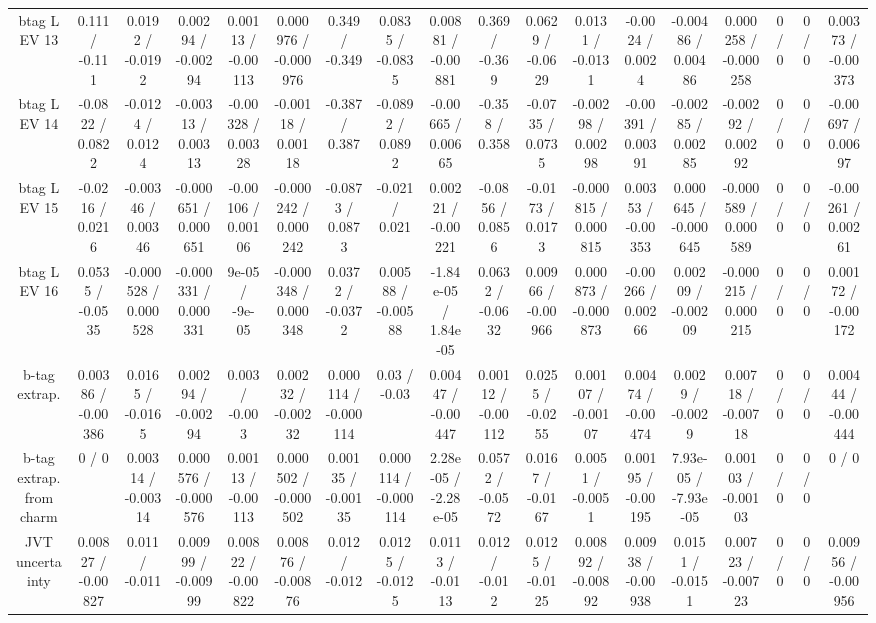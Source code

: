\documentclass[10pt]{article}
\begin{document}
\begin{table}[htbp]
\begin{center}
\begin{tabular}{|c|c|c|c|c|c|c|c|c|c|c|c|c|c|c|c|c|c|}
  btag L EV 13 & 0.111 / -0.111 & 0.0192 / -0.0192 & 0.00294 / -0.00294 & 0.00113 / -0.00113 & 0.000976 / -0.000976 & 0.349 / -0.349 & 0.0835 / -0.0835 & 0.00881 / -0.00881 & 0.369 / -0.369 & 0.0629 / -0.0629 & 0.0131 / -0.0131 & -0.0024 / 0.0024 & -0.00486 / 0.00486 & 0.000258 / -0.000258 & 0 / 0 & 0 / 0 & 0.00373 / -0.00373 \\ 
  btag L EV 14 & -0.0822 / 0.0822 & -0.0124 / 0.0124 & -0.00313 / 0.00313 & -0.00328 / 0.00328 & -0.00118 / 0.00118 & -0.387 / 0.387 & -0.0892 / 0.0892 & -0.00665 / 0.00665 & -0.358 / 0.358 & -0.0735 / 0.0735 & -0.00298 / 0.00298 & -0.00391 / 0.00391 & -0.00285 / 0.00285 & -0.00292 / 0.00292 & 0 / 0 & 0 / 0 & -0.00697 / 0.00697 \\ 
  btag L EV 15 & -0.0216 / 0.0216 & -0.00346 / 0.00346 & -0.000651 / 0.000651 & -0.00106 / 0.00106 & -0.000242 / 0.000242 & -0.0873 / 0.0873 & -0.021 / 0.021 & 0.00221 / -0.00221 & -0.0856 / 0.0856 & -0.0173 / 0.0173 & -0.000815 / 0.000815 & 0.00353 / -0.00353 & 0.000645 / -0.000645 & -0.000589 / 0.000589 & 0 / 0 & 0 / 0 & -0.00261 / 0.00261 \\ 
  btag L EV 16 & 0.0535 / -0.0535 & -0.000528 / 0.000528 & -0.000331 / 0.000331 & 9e-05 / -9e-05 & -0.000348 / 0.000348 & 0.0372 / -0.0372 & 0.00588 / -0.00588 & -1.84e-05 / 1.84e-05 & 0.0632 / -0.0632 & 0.00966 / -0.00966 & 0.000873 / -0.000873 & -0.00266 / 0.00266 & 0.00209 / -0.00209 & -0.000215 / 0.000215 & 0 / 0 & 0 / 0 & 0.00172 / -0.00172 \\ 
  b-tag extrap. & 0.00386 / -0.00386 & 0.0165 / -0.0165 & 0.00294 / -0.00294 & 0.003 / -0.003 & 0.00232 / -0.00232 & 0.000114 / -0.000114 & 0.03 / -0.03 & 0.00447 / -0.00447 & 0.00112 / -0.00112 & 0.0255 / -0.0255 & 0.00107 / -0.00107 & 0.00474 / -0.00474 & 0.0029 / -0.0029 & 0.00718 / -0.00718 & 0 / 0 & 0 / 0 & 0.00444 / -0.00444 \\ 
  b-tag extrap. from charm & 0 / 0 & 0.00314 / -0.00314 & 0.000576 / -0.000576 & 0.00113 / -0.00113 & 0.000502 / -0.000502 & 0.00135 / -0.00135 & 0.000114 / -0.000114 & 2.28e-05 / -2.28e-05 & 0.0572 / -0.0572 & 0.0167 / -0.0167 & 0.0051 / -0.0051 & 0.00195 / -0.00195 & 7.93e-05 / -7.93e-05 & 0.00103 / -0.00103 & 0 / 0 & 0 / 0 & 0 / 0 \\ 
  JVT uncertainty & 0.00827 / -0.00827 & 0.011 / -0.011 & 0.00999 / -0.00999 & 0.00822 / -0.00822 & 0.00876 / -0.00876 & 0.012 / -0.012 & 0.0125 / -0.0125 & 0.0113 / -0.0113 & 0.012 / -0.012 & 0.0125 / -0.0125 & 0.00892 / -0.00892 & 0.00938 / -0.00938 & 0.0151 / -0.0151 & 0.00723 / -0.00723 & 0 / 0 & 0 / 0 & 0.00956 / -0.00956 \\ 

\end{tabular}
\end{center}
\end{table}
\end{document}

